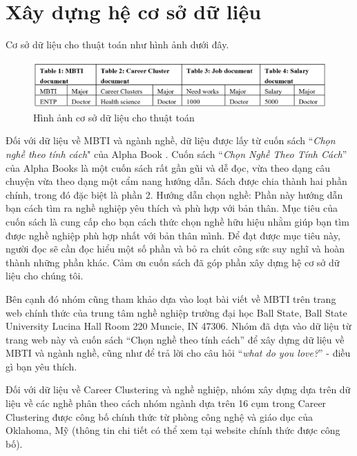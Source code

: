 \section{Xây dựng hệ cơ sở dữ liệu}\label{3.1}
Cơ sở dữ liệu cho thuật toán như hình ảnh dưới đây. 

\begin{figure}[H]
        \centering
        \includegraphics[width=0.5\linewidth]{images/data.png}
        \vspace{0.6cm}
        \caption{Hình ảnh cơ sở dữ liệu cho thuật toán}
    \end{figure}

Đối với dữ liệu về MBTI và ngành nghề, dữ liệu được lấy từ cuốn sách ``\textit{Chọn nghề theo tính cách}" của Alpha Book \cite{alpha}. Cuốn sách ``\textit{Chọn Nghề Theo Tính Cách}” của Alpha Books là một cuốn sách rất gần gũi và dễ đọc, vừa theo dạng câu chuyện vừa theo dạng một cẩm nang hướng dẫn. Sách được chia thành hai phần chính, trong đó đặc biệt là phần 2. Hướng dẫn chọn nghề: Phần này hướng dẫn bạn cách tìm ra nghề nghiệp yêu thích và phù hợp với bản thân. Mục tiêu của cuốn sách là cung cấp cho bạn cách thức chọn nghề hữu hiệu nhằm giúp bạn tìm được nghề nghiệp phù hợp nhất với bản thân mình. Để đạt được mục tiêu này, người đọc sẽ cần đọc hiểu một số phần và bỏ ra chút công sức suy nghĩ và hoàn thành những phần khác. Cảm ơn cuốn sách đã góp phần xây dựng hệ cơ sở dữ liệu cho chúng tôi. 

Bên cạnh đó nhóm cũng tham khảo dựa vào loạt bài viết về MBTI trên trang web chính thức của trung tâm nghề nghiệp trường đại học Ball State, Ball State University Lucina Hall Room 220 Muncie, IN 47306. Nhóm đã dựa vào dữ liệu từ trang web này và cuốn sách ``Chọn nghề theo tính cách” để xây dựng dữ liệu về MBTI và ngành nghề, cũng như để trả lời cho câu hỏi ``\textit{what do you love?}” - điều gì bạn yêu thích. 

Đối với dữ liệu về Career Clustering và nghề nghiệp, nhóm xây dựng dựa trên dữ liệu về các nghề phân theo cách nhóm ngành dựa trên 16 cụm trong Career Clustering được công bố chính thức từ phòng công nghệ và giáo dục của Oklahoma, Mỹ (thông tin chi tiết có thể xem tại website chính thức được công bố).

